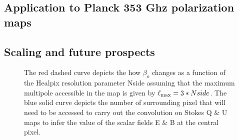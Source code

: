 \subsection{Application to Planck 353 Ghz polarization maps}
%
\begin{figure}[!h] 
\centering
{}
\caption{}
\label{fig:353ghz-eb-maps}
\end{figure}
%

\subsection{Scaling and future prospects}
%
\begin{figure}[!h] 
\centering
{}
\caption{The red dashed curve depicts the how $\beta_o$ changes as a function of the Healpix resolution parameter Nside assuming that the maximum multipole accessible in the map is given by $\ell_{\rm max} = 3 * Nside$. The blue solid curve depicts the number of surrounding pixel that will need to be accessed to carry out the convolution on Stokes Q \& U maps to infer the value of the scalar fields E \& B at the central pixel.}
\label{fig:disc_rad_healpix_numpix}
\end{figure}
%
